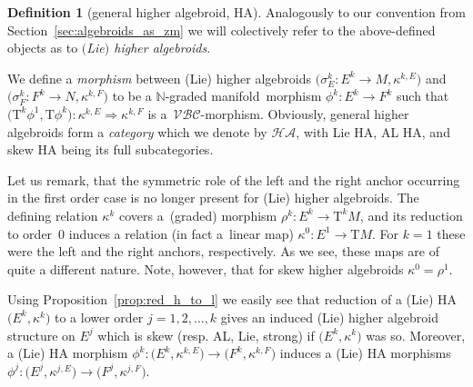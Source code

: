 \documentclass[pdftex]{sigma}
\newcommand{\grB}{{$\N$-graded manifold}}
\newcommand{\N}{\mathbb{N}}
\newcommand{\ra}{\rightarrow}
\newcommand{\mZM}{\Rightarrow}
\newcommand{\T}{\mathrm{T}} %
\newcommand{\TT}[1]{\mathrm{T}^{#1}} %
\newcommand{\catZM}{{\mathcal{VBC}}} %
\newcommand{\catHA}{\mathcal{HA}} %
\numberwithin{equation}{section}
\theoremstyle{definition}
\newtheorem{df}[thm]{Definition}
\begin{document}
\begin{df}[general higher algebroid, HA]
Analogously to our convention from Section~\ref{sec:algebroids_as_zm} we will colectively refer to the above-defined objects as to \emph{$($Lie$)$ higher algebroids}.

We define a \emph{morphism} between (Lie) higher algebroids $\big(\sigma^k_E\colon E^k\ra M, \kappa^{k,E}\big)$ and $\big(\sigma^k_F\colon F^k\ra N, \kappa^{k,F}\big)$ to be a \grB\ morphism $\phi^k\colon E^k\ra F^k$ such that $\big(\TT{k} \phi^1, \T \phi^k\big)\colon \kappa^{k,E}\mZM \kappa^{k,F}$ is a~$\catZM$-morphism. Obviously, general higher algebroids form a \emph{category} which we denote by $\catHA$, with Lie HA, AL HA, and skew HA being its full subcategories.
\end{df}

Let us remark, that the symmetric role of the left and the right anchor occurring in the first order case is no longer present for (Lie) higher algebroids. The defining relation $\kappa^k$ covers a~(graded) morphism $\rho^k\colon E^k\ra\TT{k}M$, and its reduction to order~0 induces a relation (in fact a~linear map) $\kappa^0\colon E^1\ra \T M$. For $k=1$ these were the left and the right anchors, respectively. As we see, these maps are of quite a different nature. Note, however, that for skew higher algebroids $\kappa^0=\rho^1$.

Using Proposition~\ref{prop:red_h_to_l} we easily see that reduction of a (Lie) HA $\big(E^k, \kappa^k\big)$ to a lower order $j=1,2,\hdots,k$ gives an induced (Lie) higher algebroid structure on $E^j$ which is skew (resp. AL, Lie, strong) if $\big(E^k, \kappa^k\big)$ was so. Moreover, a (Lie) HA morphism $\phi^k\colon \big(E^k, \kappa^{k,E}\big)\ra \big(F^k, \kappa^{k,F}\big)$ induces a (Lie) HA morphisms $\phi^j\colon \big(E^j, \kappa^{j,E}\big)\ra \big(F^j, \kappa^{j,F}\big)$.
\end{document}
